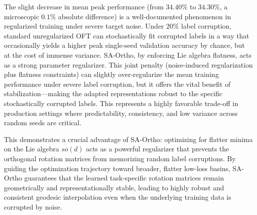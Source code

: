 \documentclass{article}
\theoremstyle{plain}
\theoremstyle{definition}
\theoremstyle{remark}
\begin{document}
The slight decrease in mean peak performance (from $34.40\%$ to $34.30\%$, a microscopic $0.1\%$ absolute difference) is a well-documented phenomenon in regularized training under severe target noise. Under 20\% label corruption, standard unregularized OFT can stochastically fit corrupted labels in a way that occasionally yields a higher peak single-seed validation accuracy by chance, but at the cost of immense variance. SA-Ortho, by enforcing Lie algebra flatness, acts as a strong parameter regularizer. This joint penalty (noise-induced regularization plus flatness constraints) can slightly over-regularize the mean training performance under severe label corruption, but it offers the vital benefit of stabilization—making the adapted representations robust to the specific stochastically corrupted labels. This represents a highly favorable trade-off in production settings where predictability, consistency, and low variance across random seeds are critical.

This demonstrates a crucial advantage of SA-Ortho: optimizing for flatter minima on the Lie algebra $so(d)$ acts as a powerful regularizer that prevents the orthogonal rotation matrices from memorizing random label corruptions. By guiding the optimization trajectory toward broader, flatter low-loss basins, SA-Ortho guarantees that the learned task-specific rotation matrices remain geometrically and representationally stable, leading to highly robust and consistent geodesic interpolation even when the underlying training data is corrupted by noise.
\end{document}
